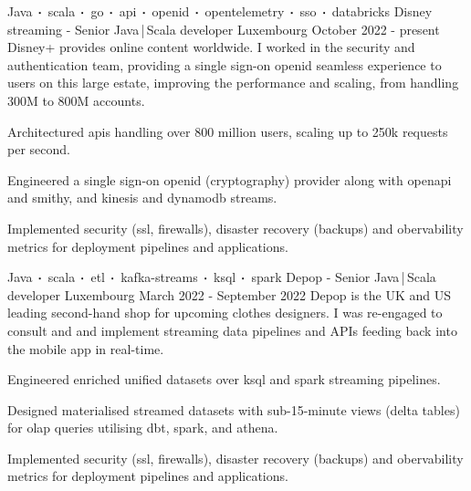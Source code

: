 
\newcommand*{\logo}[2]{\raisebox{-0.2em}{\texttt{[image: \#2]}}\hspace{0.25em}#1}
\newcommand*{\logoonly}[1]{\raisebox{-0.2em}{\texttt{[image: \#1]}}}

\begin{cventries}
    \cventry
    {Java$\sqbig$scala$\sqbig$go$\sqbig$api$\sqbig$openid$\sqbig$opentelemetry$\sqbig$sso$\sqbig$databricks}
    {\logo{Disney streaming}{../../../images/disney.png} - Senior Java\,|\,Scala developer}
    {Luxembourg}
    {October 2022 - present}
    {Disney+ provides online content worldwide. I worked in the security and authentication team, providing a single sign-on openid seamless experience to users on this large estate, improving the performance and scaling, from handling 300M to 800M accounts.}
    {
        \begin{cvitems}
            \item{Architectured apis handling over 800 million users, scaling up to 250k requests per second.}
            \item{Engineered a single sign-on openid (cryptography) provider along with openapi and smithy, and kinesis and dynamodb streams.}
            \item{Implemented security (ssl, firewalls), disaster recovery (backups) and obervability metrics for deployment pipelines and applications.}
        \end{cvitems}
    }

    \cventry
    {Java$\sqbig$scala$\sqbig$etl$\sqbig$kafka-streams$\sqbig$ksql$\sqbig$spark}
    {\logo{Depop}{../../../images/depop.jpg} - Senior Java\,|\,Scala developer}
    {Luxembourg}
    {March 2022 - September 2022}
    {Depop is the UK and US leading second-hand shop for upcoming clothes designers. I was re-engaged to consult and and implement streaming data pipelines and APIs feeding back into the mobile app in real-time.}
    {
        \begin{cvitems}
            \item{Engineered enriched unified datasets over ksql and spark streaming pipelines.}
            \item{Designed materialised streamed datasets with sub-15-minute views (delta tables) for olap queries utilising dbt, spark, and athena.}
            \item{Implemented security (ssl, firewalls), disaster recovery (backups) and obervability metrics for deployment pipelines and applications.}
        \end{cvitems}
    }


\end{cventries}
